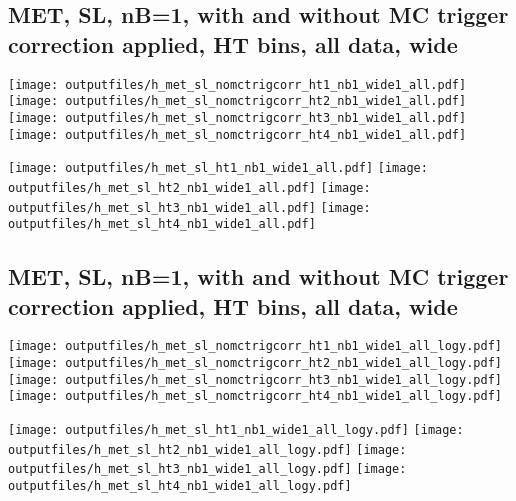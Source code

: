 \documentclass[11pt]{article}
\begin{document}
     \clearpage
     \subsection{ MET, SL, nB=1, with and without MC trigger correction applied, HT bins, all data, wide}

    \noindent
     \texttt{[image: outputfiles/h\_met\_sl\_nomctrigcorr\_ht1\_nb1\_wide1\_all.pdf]}
     \texttt{[image: outputfiles/h\_met\_sl\_nomctrigcorr\_ht2\_nb1\_wide1\_all.pdf]}
     \texttt{[image: outputfiles/h\_met\_sl\_nomctrigcorr\_ht3\_nb1\_wide1\_all.pdf]}
     \texttt{[image: outputfiles/h\_met\_sl\_nomctrigcorr\_ht4\_nb1\_wide1\_all.pdf]}

    \noindent
     \texttt{[image: outputfiles/h\_met\_sl\_ht1\_nb1\_wide1\_all.pdf]}
     \texttt{[image: outputfiles/h\_met\_sl\_ht2\_nb1\_wide1\_all.pdf]}
     \texttt{[image: outputfiles/h\_met\_sl\_ht3\_nb1\_wide1\_all.pdf]}
     \texttt{[image: outputfiles/h\_met\_sl\_ht4\_nb1\_wide1\_all.pdf]}

    \clearpage
     \subsection{ MET, SL, nB=1, with and without MC trigger correction applied, HT bins, all data, wide}

    \noindent
     \texttt{[image: outputfiles/h\_met\_sl\_nomctrigcorr\_ht1\_nb1\_wide1\_all\_logy.pdf]}
     \texttt{[image: outputfiles/h\_met\_sl\_nomctrigcorr\_ht2\_nb1\_wide1\_all\_logy.pdf]}
     \texttt{[image: outputfiles/h\_met\_sl\_nomctrigcorr\_ht3\_nb1\_wide1\_all\_logy.pdf]}
     \texttt{[image: outputfiles/h\_met\_sl\_nomctrigcorr\_ht4\_nb1\_wide1\_all\_logy.pdf]}


    \noindent
     \texttt{[image: outputfiles/h\_met\_sl\_ht1\_nb1\_wide1\_all\_logy.pdf]}
     \texttt{[image: outputfiles/h\_met\_sl\_ht2\_nb1\_wide1\_all\_logy.pdf]}
     \texttt{[image: outputfiles/h\_met\_sl\_ht3\_nb1\_wide1\_all\_logy.pdf]}
     \texttt{[image: outputfiles/h\_met\_sl\_ht4\_nb1\_wide1\_all\_logy.pdf]}


     \clearpage
\end{document}
